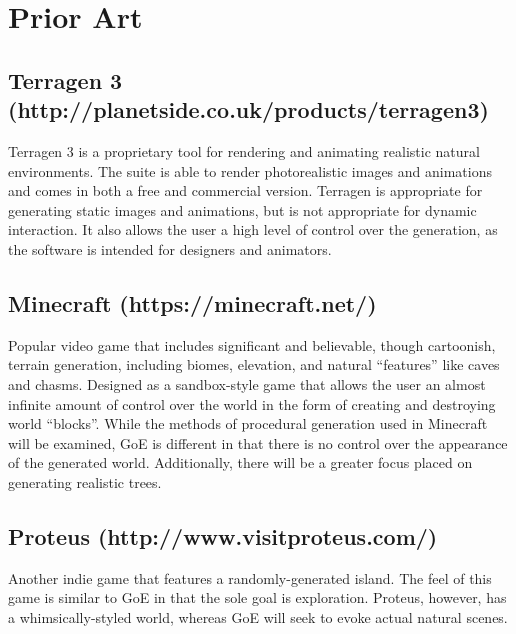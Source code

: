 \documentclass{article}
\newcommand{\tab}{\hspace*{2em}}
\begin{document}
    \section{Prior Art}
        \subsection{Terragen 3 (http://planetside.co.uk/products/terragen3)}
\tab Terragen 3 is a proprietary tool for rendering and animating realistic
natural environments. The suite is able to render photorealistic images and
animations and comes in both a free and commercial version. Terragen is
appropriate for generating static images and animations, but is not appropriate
for dynamic interaction. It also allows the user a high level of control over 
the generation, as the software is intended for designers and animators.

        \subsection{Minecraft (https://minecraft.net/)}
\tab Popular video game that includes significant and believable, though
cartoonish, terrain generation, including biomes, elevation, and natural
“features” like caves and chasms. Designed as a sandbox-style game that allows
the user an almost infinite amount of control over the world in the form of
creating and destroying world “blocks”. While the methods of procedural
generation used in Minecraft will be examined, GoE is different in that there is
no control over the appearance of the generated world. Additionally, there will
be a greater focus placed on generating realistic trees.

        \subsection{Proteus (http://www.visitproteus.com/)}
\tab Another indie game that features a randomly-generated island. The feel of
this game is similar to GoE in that the sole goal is exploration. Proteus,
however, has a whimsically-styled world, whereas GoE will seek to evoke actual
natural scenes.
\end{document}
